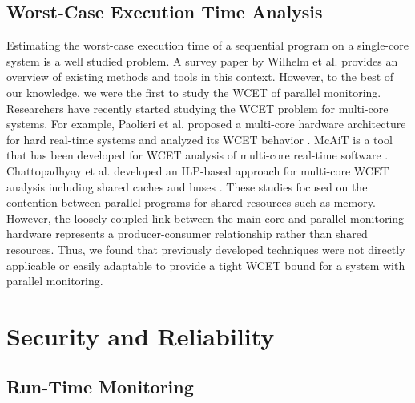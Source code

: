 \subsection{Worst-Case Execution Time Analysis}

Estimating the worst-case execution time of a sequential program on a
single-core system is a well studied problem. A survey paper by Wilhelm et al.
\cite{wcetsurvey-tecs08} provides an overview of existing methods and tools in
this context.  However, to the best of our knowledge, we were the
first to study the WCET of parallel monitoring.  Researchers have recently
started studying the WCET problem for multi-core systems. For example,
Paolieri et al. proposed a multi-core hardware architecture for hard real-time
systems and analyzed its WCET behavior \cite{paolieri-isca09}.  McAiT is a tool
that has been developed for WCET analysis of multi-core real-time software
\cite{mcait-rtss10}. Chattopadhyay et al. developed an ILP-based approach for
multi-core WCET analysis including shared caches and buses
\cite{chattopadhyay-rtas12}. These studies focused on the contention between
parallel programs for shared resources such as memory. However, the loosely
coupled link between the main core and parallel monitoring hardware represents
a producer-consumer relationship rather than shared resources. Thus, we found
that previously developed techniques were not directly applicable or easily
adaptable to provide a tight WCET bound for a system with parallel monitoring.

\section{Security and Reliability}
\label{sec:related_work.security}

\subsection{Run-Time Monitoring}

